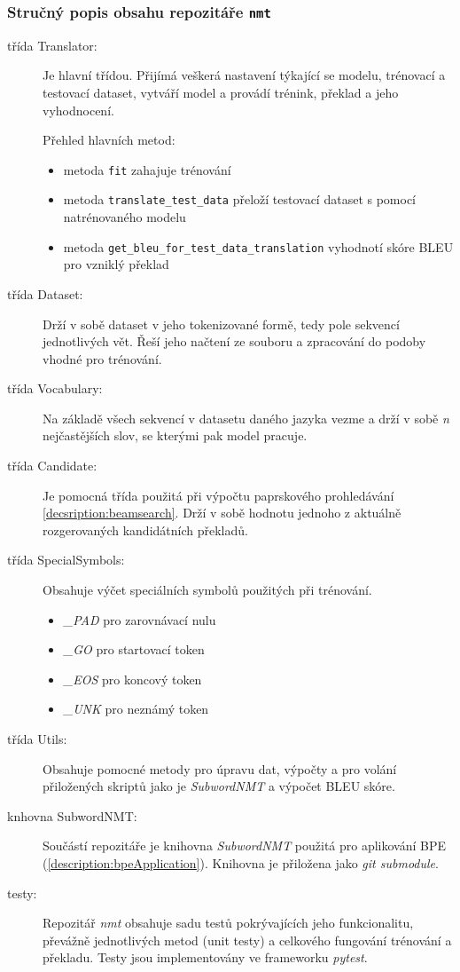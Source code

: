 

\subsubsection{Stručný popis obsahu repozitáře \texttt{nmt}}
\begin{description}
  \item[třída Translator:] Je hlavní třídou. Přijímá veškerá nastavení týkající se modelu, trénovací a testovací dataset, vytváří model a provádí trénink, překlad a jeho vyhodnocení.

      Přehled hlavních metod:
      \begin{itemize}
                  \item metoda \texttt{fit} zahajuje trénování
                  \item metoda \texttt{translate\_test\_data} přeloží testovací dataset s pomocí natrénovaného modelu
                  \item metoda \texttt{get\_bleu\_for\_test\_data\_translation} vyhodnotí skóre BLEU pro vzniklý překlad
      \end{itemize}
  \item[třída Dataset:] Drží v sobě dataset v jeho tokenizované formě, tedy pole sekvencí jednotlivých vět. Řeší jeho načtení ze souboru a zpracování do podoby vhodné pro trénování.
  \item[třída Vocabulary:] Na základě všech sekvencí v datasetu daného jazyka vezme a drží v sobě \emph{n} nejčastějších slov, se kterými pak model pracuje.
  \item[třída Candidate:] Je pomocná třída použitá při výpočtu paprskového prohledávání \ref{decsription:beamsearch}. Drží v sobě hodnotu jednoho z aktuálně rozgerovaných kandidátních překladů.
  \item[třída SpecialSymbols:] Obsahuje výčet speciálních symbolů použitých při trénování. \begin{itemize}
                  \item \emph{\_PAD} pro zarovnávací nulu
                  \item \emph{\_GO} pro startovací token
                  \item \emph{\_EOS} pro koncový token
                  \item \emph{\_UNK} pro neznámý token
                \end{itemize}
  \item[třída Utils:] Obsahuje pomocné metody pro úpravu dat, výpočty a pro volání přiložených skriptů jako je \emph{SubwordNMT} a výpočet BLEU skóre.
  \item[knhovna SubwordNMT:] Součástí repozitáře je knihovna \emph{SubwordNMT} použitá pro aplikování BPE (\ref{description:bpeApplication}). Knihovna je přiložena jako \emph{git submodule}.
  \item[testy:] Repozitář \emph{nmt} obsahuje sadu testů pokrývajících jeho funkcionalitu, převážně jednotlivých metod (unit testy) a celkového fungování trénování a překladu. Testy jsou implementovány ve frameworku \emph{pytest}.
\end{description}

